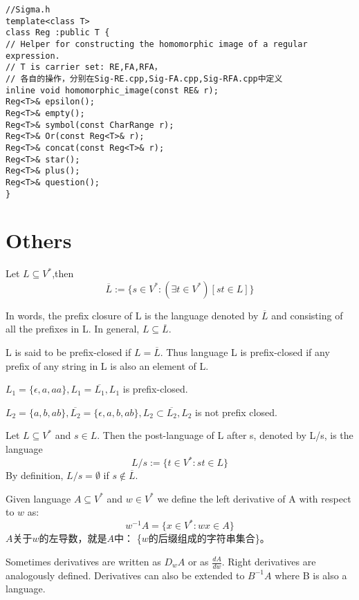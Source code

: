 \begin{lstlisting}
//Sigma.h
template<class T>
class Reg :public T {
// Helper for constructing the homomorphic image of a regular expression.
// T is carrier set: RE,FA,RFA，
// 各自的操作，分别在Sig-RE.cpp,Sig-FA.cpp,Sig-RFA.cpp中定义
inline void homomorphic_image(const RE& r);
Reg<T>& epsilon();
Reg<T>& empty();
Reg<T>& symbol(const CharRange r);
Reg<T>& Or(const Reg<T>& r);
Reg<T>& concat(const Reg<T>& r);
Reg<T>& star();
Reg<T>& plus();
Reg<T>& question();
}
\end{lstlisting}

\section{Others}

\begin{definition}
	Let $L\subseteq V^*$,then
	$$\overline{L} := \{s\in V^*:(\exists t\in V^*)[st\in L]\}$$
\end{definition}
In words, the prefix closure of L is the language denoted by $\overline{L}$ and consisting of all the prefixes in L. In general, $L\subseteq \overline{L}$.

L is said to be prefix-closed if $L = \overline{L}$. Thus language L is prefix-closed if any prefix of any string in L is also an element of L.

$L_1 = \{\epsilon,a,aa\}, L_1 = \overline{L_1}, L_{1}$ is prefix-closed.

$L_2 = \{a,b,ab\}, \overline{L_2} = \{\epsilon,a,b,ab\}, L_2 \subset \overline{L_2}, L_2$ is not prefix closed.

\hfill

\begin{definition}
Let $L\subseteq V^{\ast}$ and $s\in L$. Then the post-language of L after s, denoted by L/s, is the language
$$ L/s := \{t\in V^{\ast}:st\in L\}$$
By definition, $L/s = \emptyset$ if $s \notin \overline{L}$.
\end{definition}

\hfill

\begin{definition} Given language $A\subseteq V^{\ast}$ and $w\in V^{\ast}$ we define the left derivative of A with respect to $w$ as:
$$w^{-1}A = \{x\in V^{\ast}:wx\in A\}$$
$A$关于$w$的左导数，就是$A$中： \{$w$的后缀组成的字符串集合\}。

Sometimes derivatives are written as $D_{w}A$ or as $\frac{dA}{dw}$. Right derivatives are analogously defined. Derivatives can also be extended to $B^{-1}A$ where B is also a language.
\end{definition}

